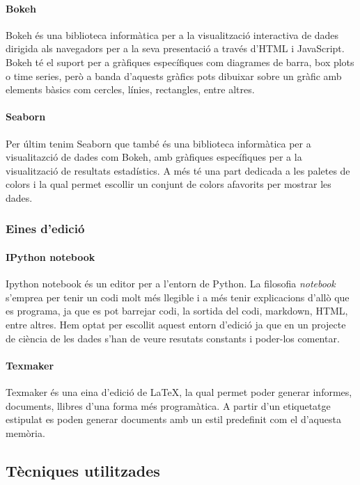 \documentclass[12pt,a4paper,catalan]{article}
\begin{document}
\paragraph{Bokeh}
Bokeh \cite{bokeh} és una biblioteca informàtica per a la visualització interactiva de dades dirigida als navegadors per a la seva presentació a través d'HTML i JavaScript. Bokeh té el suport per a gràfiques específiques com diagrames de barra, box plots o time series, però a banda d'aquests gràfics pots dibuixar sobre un gràfic amb elements bàsics com cercles, línies, rectangles, entre altres.

\paragraph{Seaborn}
Per últim tenim Seaborn \cite{seaborn} que també és una biblioteca informàtica per a visualitazció de dades com Bokeh, amb gràfiques específiques per a la visualització de resultats estadístics. A més té una part dedicada a les paletes de colors i la qual permet escollir un conjunt de colors afavorits per mostrar les dades.


\subsubsection{Eines d'edició}
\paragraph{IPython notebook}
Ipython notebook \cite{ipythonnotebook} és un editor per a l'entorn de Python. La filosofia \textit{notebook} s'emprea per tenir un codi molt més llegible i a més tenir explicacions d'allò que es programa, ja que es pot barrejar codi, la sortida del codi, markdown, HTML, entre altres. Hem optat per escollit aquest entorn d'edició ja que en un projecte de ciència de les dades s'han de veure resutats constants i poder-los comentar.

\paragraph{Texmaker}
Texmaker \cite{texmaker} és una eina d'edició de \LaTeX, la qual permet poder generar informes, documents, llibres d'una forma més programàtica. A partir d'un etiquetatge estipulat es poden generar documents amb un estil predefinit com el d'aquesta memòria.

\newpage
\hypertarget{tecniquesutilitzades}{
	\subsection{Tècniques utilitzades}
}
\end{document}
